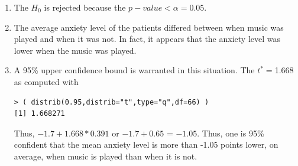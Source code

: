 \documentclass[10pt,openany]{book}\usepackage[]{graphicx}\usepackage[]{color}
\makeatletter
\newenvironment{kframe}{%
 \def\at@end@of@kframe{}%
 \ifinner\ifhmode%
  \def\at@end@of@kframe{\end{minipage}}%
  \begin{minipage}{\columnwidth}%
 \fi\fi%
 \def\FrameCommand##1{\hskip\@totalleftmargin \hskip-\fboxsep
 \colorbox{shadecolor}{##1}\hskip-\fboxsep
     \hskip-\linewidth \hskip-\@totalleftmargin \hskip\columnwidth}%
 \MakeFramed {\advance\hsize-\width
   \@totalleftmargin\z@ \linewidth\hsize
   \@setminipage}}%
 {\par\unskip\endMakeFramed%
 \at@end@of@kframe}
\newenvironment{knitrout}{}{} %
\makeatother
\begin{document}
\begin{enumerate}
\begin{knitrout}
\end{knitrout}
    \item The $H_{0}$ is rejected because the $p-value <\alpha=0.05$.
    \item The average anxiety level of the patients differed between when music was played and when it was not.  In fact, it appears that the anxiety level was lower when the music was played.
    \item A 95\% upper confidence bound is warranted in this situation.  The $t^{*}=$1.668 as computed with
\begin{knitrout}
\color{fgcolor}\begin{kframe}
\begin{verbatim}
> ( distrib(0.95,distrib="t",type="q",df=66) )
[1] 1.668271
\end{verbatim}
\end{kframe}
\end{knitrout}
Thus, $-1.7+1.668*0.391$ or $-1.7+0.65$ = $-1.05$.  Thus, one is 95\% confident that the mean anxiety level is more than -1.05 points lower, on average, when music is played than when it is not.
  \end{enumerate}
\end{document}
